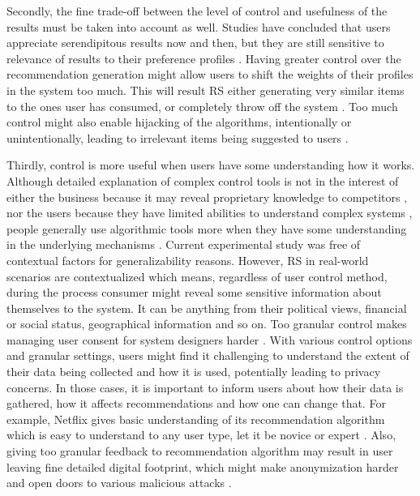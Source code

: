 \documentclass[a4paper,12pt]{article}
\begin{document}
Secondly, the fine trade-off between the level of control and usefulness of the results must be taken into account as well. Studies have concluded that users appreciate serendipitous results now and then, but they are still sensitive to relevance of results to their preference profiles \citep{kotkovSurveySerendipityRecommender2016}. Having greater control over the recommendation generation might allow users to shift the  weights of their profiles in the system too much. This will result RS either generating very similar items to the ones user has consumed, or completely throw off the system \citep{mantovani2019meta}. Too much control might also enable hijacking of the algorithms, intentionally or unintentionally, leading to irrelevant items being suggested to users \citep{xing2013take}. 

Thirdly, control is more useful when users have some understanding how it works. Although detailed explanation of complex control tools is not in the interest of either the business because it may reveal proprietary knowledge to competitors \citep{lubit2001tacit}, nor the users because they have limited abilities to understand complex systems \citep{kahneman1979interpretation}, people generally use algorithmic tools more when they have some understanding in the underlying mechanisms \citep{guidotti2018survey}. Current experimental study was free of contextual factors for generalizability reasons. However, RS in real-world scenarios are contextualized which means, regardless of user control method, during the process consumer might reveal some sensitive information about themselves to the system. It can be anything from their political views, financial or social status, geographical information and so on. Too granular control makes managing user consent for system designers harder \citep{belanger2011privacy}. With various control options and granular settings, users might find it challenging to understand the extent of their data being collected and how it is used, potentially leading to privacy concerns. In those cases, it is important to inform users about how their data is gathered, how it affects recommendations and how one can change that. For example, Netflix gives basic understanding of its recommendation algorithm which is easy to understand to any user type, let it be novice or expert \citep{netflix_help_page}. Also, giving too granular feedback to recommendation algorithm may result in user leaving fine detailed digital footprint, which might make anonymization harder and open doors to various malicious attacks \citep{sweeney2002k}.
\end{document}
